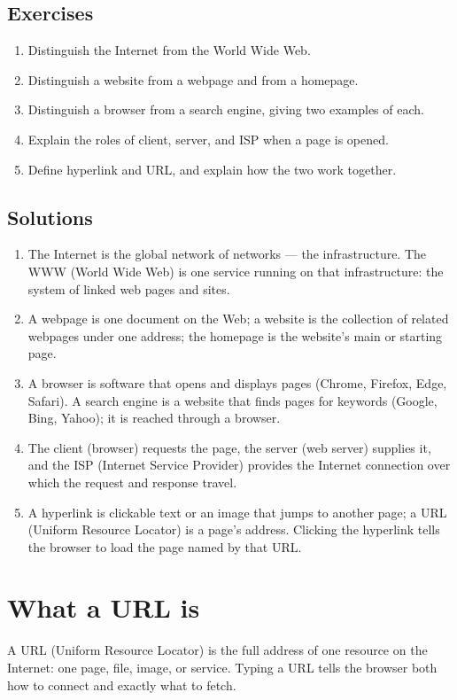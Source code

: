 \subsection*{Exercises}
\begin{enumerate}[label=\arabic*.]
  \item Distinguish the Internet from the World Wide Web.
  \item Distinguish a website from a webpage and from a homepage.
  \item Distinguish a browser from a search engine, giving two examples of
    each.
  \item Explain the roles of client, server, and ISP when a page is opened.
  \item Define hyperlink and URL, and explain how the two work together.
\end{enumerate}

\subsection*{Solutions}
\begingroup\small
\begin{enumerate}[label=\arabic*.]
  \item The Internet is the global network of networks --- the
    infrastructure. The WWW (World Wide Web) is one service running on that
    infrastructure: the system of linked web pages and sites.
  \item A webpage is one document on the Web; a website is the collection of
    related webpages under one address; the homepage is the website's main or
    starting page.
  \item A browser is software that opens and displays pages (Chrome, Firefox,
    Edge, Safari). A search engine is a website that finds pages for keywords
    (Google, Bing, Yahoo); it is reached through a browser.
  \item The client (browser) requests the page, the server (web server)
    supplies it, and the ISP (Internet Service Provider) provides the
    Internet connection over which the request and response travel.
  \item A hyperlink is clickable text or an image that jumps to another page;
    a URL (Uniform Resource Locator) is a page's address. Clicking the
    hyperlink tells the browser to load the page named by that URL.
\end{enumerate}
\endgroup

\section{What a URL is}
A URL (Uniform Resource Locator) is the full address of one resource on the
Internet: one page, file, image, or service. Typing a URL tells the browser
both how to connect and exactly what to fetch.

